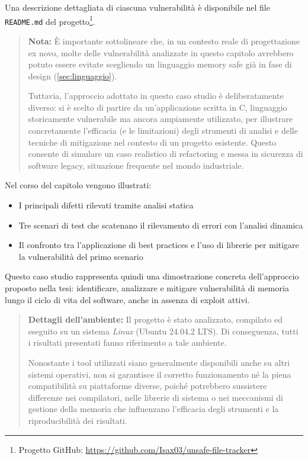 Una descrizione dettagliata di ciascuna vulnerabilità è disponibile nel file \texttt{README.md}
del progetto\footnote{Progetto GitHub: \url{https://github.com/Isax03/unsafe-file-tracker}}.

\begin{quote}
  \textbf{Nota:} È importante sottolineare che, in un contesto reale di progettazione
  ex novo, molte delle vulnerabilità analizzate in questo capitolo avrebbero
  potuto essere evitate scegliendo un linguaggio memory safe già in fase di
  design (\autoref{sec:linguaggio}).

  Tuttavia, l'approccio adottato in questo caso studio è deliberatamente diverso:
  si è scelto di partire da un'applicazione scritta in C, linguaggio storicamente
  vulnerabile ma ancora ampiamente utilizzato, per illustrare concretamente l'efficacia
  (e le limitazioni) degli strumenti di analisi e delle tecniche di mitigazione
  nel contesto di un progetto esistente. Questo consente di simulare un caso realistico
  di refactoring e messa in sicurezza di software legacy, situazione frequente
  nel mondo industriale.
\end{quote}

Nel corso del capitolo vengono illustrati:
\begin{itemize}
  \item I principali difetti rilevati tramite analisi statica

  \item Tre scenari di test che scatenano il rilevamento di errori con l'analisi
    dinamica

  \item Il confronto tra l'applicazione di best practices e l'uso di librerie per
    mitigare la vulnerabilità del primo scenario
\end{itemize}

Questo caso studio rappresenta quindi una dimostrazione concreta dell'approccio
proposto nella tesi: identificare, analizzare e mitigare vulnerabilità di
memoria lungo il ciclo di vita del software, anche in assenza di exploit attivi.

\begin{quote}
  \textbf{Dettagli dell'ambiente:} Il progetto è stato analizzato, compilato ed eseguito
  su un sistema \textit{Linux} (Ubuntu 24.04.2 LTS). Di conseguenza, tutti i risultati
  presentati fanno riferimento a tale ambiente.

  Nonostante i tool utilizzati siano generalmente disponibili anche su altri sistemi
  operativi, non si garantisce il corretto funzionamento né la piena
  compatibilità su piattaforme diverse, poiché potrebbero sussistere differenze nei
  compilatori, nelle librerie di sistema o nei meccanismi di gestione della
  memoria che influenzano l'efficacia degli strumenti e la riproducibilità dei
  risultati.
\end{quote}


